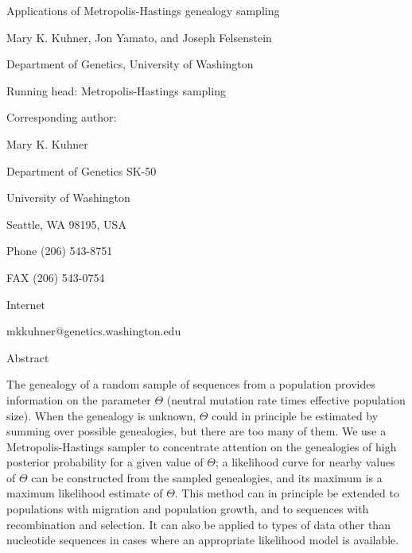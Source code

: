 \def\baselinestretch{1.5}
\setlength{\topmargin}{0pt}
\setlength{\textheight}{570pt}
\setlength{\oddsidemargin}{0pt}
\setlength{\evensidemargin}{60pt}
\setlength{\textwidth}{427pt}
\setlength{\footheight}{0pt}
\setlength{\footskip}{30pt}
\parindent 25pt
\pagestyle{plain}


\begin{flushleft}

Applications of Metropolis-Hastings genealogy sampling

\bigskip
\bigskip
Mary K. Kuhner, Jon Yamato, and Joseph Felsenstein

Department of Genetics, University of Washington

\bigskip
Running head:  Metropolis-Hastings sampling

\bigskip
Corresponding author:  
\bigskip

Mary K. Kuhner

Department of Genetics SK-50

University of Washington

Seattle, WA 98195, USA

Phone (206) 543-8751

FAX (206) 543-0754

Internet 
\begin{it}
mkkuhner@genetics.washington.edu
\end{it}
\end{flushleft}

\newpage

{\center Abstract}
\bigskip

The genealogy of a random sample of sequences from a population provides
information on the parameter $\Theta$ (neutral mutation rate times effective
population size).  When the genealogy is unknown, $\Theta$ could in
principle be
estimated by summing over possible genealogies, but there are too
many of them.  We use a
Metropolis-Hastings sampler to concentrate attention on the genealogies
of high posterior probability for a given value of $\Theta$; a
likelihood curve for nearby values of $\Theta$ can be constructed from
the sampled genealogies,
and its maximum is a maximum likelihood estimate of $\Theta$.  
This method can in principle be extended to
populations with migration and population growth, and to sequences with
recombination and selection.  It can also be applied to types of data
other than nucleotide sequences in cases where an appropriate 
likelihood model is 
available.

